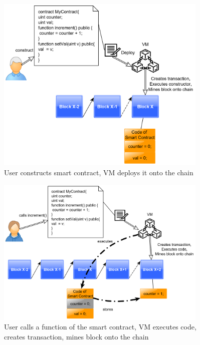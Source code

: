 \documentclass[a4paper]{article}
\begin{document}
\begin{figure}[H]
    \centering
    \includegraphics[width=0.9\textwidth]{figures/deploy_0.png}
    \caption{User constructs smart contract, VM deploys it onto the chain}
    \label{fig:deploy_0}
\end{figure}
\begin{figure}[H]
    \centering
    \includegraphics[width=0.9\textwidth]{figures/deploy_1.png}
    \caption{User calls a function of the smart contract, VM executes code, creates transaction, mines block onto the chain}
    \label{fig:deploy_1}
\end{figure}
\end{document}

